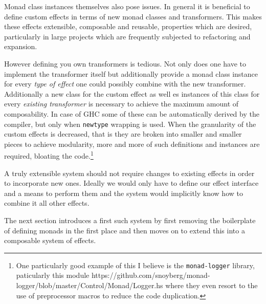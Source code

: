 Monad class instances themselves also pose issues. In general it is beneficial
to define custom effects in terms of new monad classes and transformers. This
makes these effects extensible, composable and reusable, properties which are
desired, particularly in large projects which are frequently subjected to
refactoring and expansion.

However defining you own transformers is tedious. Not only does one have to
implement the transformer itself but additionally provide a monad class instance
for every \emph{type of effect} one could possibly combine with the new
transformer. Additionally a new class for the custom effect as well es instances
of this class for every \emph{existing transformer} is necessary to achieve the
maximum amount of composability. In case of GHC some of these can be
automatically derived by the compiler, but only when \texttt{newtype} wrapping
is used. When the granularity of the custom effects is decreased, that is they
are broken into smaller and smaller pieces to achieve modularity, more and more
of such definitions and instances are required, bloating the code.\footnote{One
  particularly good example of this I believe is the \texttt{monad-logger}
  library, paticularly this module
  https://github.com/snoyberg/monad-logger/blob/master/Control/Monad/Logger.hs
  where they even resort to the use of preprocessor macros to reduce the code
  duplication.}

A truly extensible system should not require changes to existing effects in
order to incorporate new ones. Ideally we would only have to define our effect
interface and a means to perform them and the system would implicitly know how
to combine it all other effects.

The next section introduces a first such system by first removing the
boilerplate of defining monads in the first place and then moves on to extend
this into a composable system of effects.
